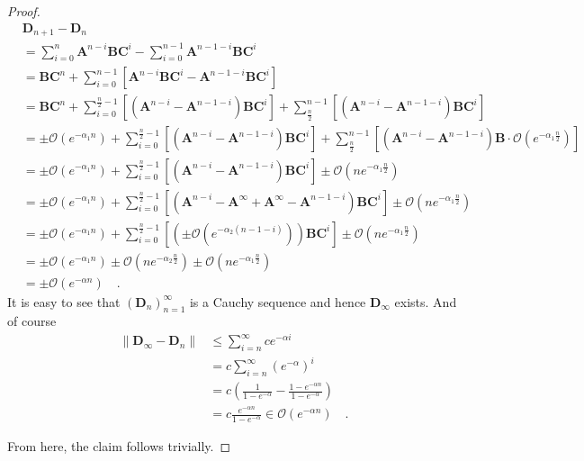\documentclass[../../main.tex]{subfiles}
\begin{document}
\begin{proof}
        \begin{align*}
            &\bm{D}_{n+1} - \bm{D}_{n} \\
            &= \sum_{i=0}^{n} \bm{A}^{n-i}\bm{BC}^i - \sum_{i=0}^{n-1} \bm{A}^{n-1-i}\bm{BC}^i \\
            &= \bm{BC}^n + \sum_{i=0}^{n-1} \left[ \bm{A}^{n-i}\bm{BC}^i - \bm{A}^{n-1-i}\bm{BC}^i \right] \\
            &= \bm{BC}^n + \sum_{i=0}^{\frac{n}{2}-1} \left[ \left( \bm{A}^{n-i} - \bm{A}^{n-1-i} \right) \bm{BC}^i \right] + \sum_{\frac{n}{2}}^{n-1} \left[ \left( \bm{A}^{n-i} - \bm{A}^{n-1-i} \right) \bm{BC}^i \right] \\
            &= \pm \mathcal{O}(e^{-\alpha_1 n}) + \sum_{i=0}^{\frac{n}{2}-1} \left[ \left( \bm{A}^{n-i} - \bm{A}^{n-1-i} \right) \bm{BC}^i \right] + \sum_{\frac{n}{2}}^{n-1} \left[ \left( \bm{A}^{n-i} - \bm{A}^{n-1-i} \right) \bm{B} \cdot \mathcal{O}(e^{-\alpha_1 \frac{n}{2}}) \right] \\
            &= \pm \mathcal{O}(e^{-\alpha_1 n}) + \sum_{i=0}^{\frac{n}{2}-1} \left[ \left( \bm{A}^{n-i} - \bm{A}^{n-1-i} \right) \bm{BC}^i \right] \pm \mathcal{O}(n e^{-\alpha_1 \frac{n}{2}}) \\
            &= \pm \mathcal{O}(e^{-\alpha_1 n}) + \sum_{i=0}^{\frac{n}{2}-1} \left[ \left( \bm{A}^{n-i} - \bm{A}^\infty + \bm{A}^\infty - \bm{A}^{n-1-i} \right) \bm{BC}^i \right] \pm \mathcal{O}(n e^{-\alpha_1 \frac{n}{2}}) \\
            &= \pm \mathcal{O}(e^{-\alpha_1 n}) + \sum_{i=0}^{\frac{n}{2}-1} \left[ \left( \pm \mathcal{O}(e^{-\alpha_2 (n-1-i)}) \right) \bm{BC}^i \right] \pm \mathcal{O}(n e^{-\alpha_1 \frac{n}{2}}) \\
            &= \pm \mathcal{O}(e^{-\alpha_1 n})  \pm \mathcal{O}(n e^{-\alpha_2 \frac{n}{2}}) \pm \mathcal{O}(n e^{-\alpha_1 \frac{n}{2}}) \\
            &= \pm \mathcal{O}(e^{-\alpha n}) \quad .
        \end{align*}
        It is easy to see that $(\bm{D}_n)_{n=1}^{\infty}$ is a Cauchy sequence and hence $\bm{D}_\infty$ exists. And of course
        \begin{align*}
            \|\bm{D}_\infty - \bm{D}_{n}\| &\leq \sum_{i=n}^{\infty} c e^{-\alpha i} \\
            &= c \sum_{i=n}^{\infty} (e^{-\alpha})^i \\
            &= c \left( \frac{1}{1 - e^{-\alpha}} - \frac{1 - e^{-\alpha n}}{1 - e^{-\alpha} } \right) \\
            &= c \frac{e^{-\alpha n}}{1 - e^{-\alpha}} \in \mathcal{O}(e^{-\alpha n}) \quad .
        \end{align*}
        
        From here, the claim follows trivially.
    \end{proof}
\end{document}
